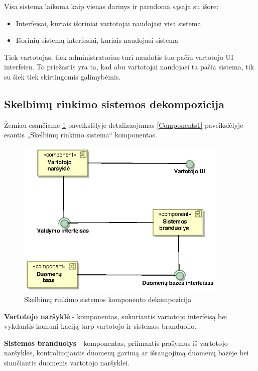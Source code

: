 \documentclass[12pt]{article}
\begin{document}
	 Visa sistema laikoma kaip vienas darinys ir parodoma sąsaja su išore:
	
	\begin{itemize}	
		\item Interfeisai, kuriais išoriniai vartotojai naudojasi visa sistema
		\item Išorinių sistemų interfesiai, kuriais naudojasi sistema
	\end{itemize}
	
	Tiek vartotojas, tiek administratorius turi naudotis tuo pačiu vartotojo UI interfeisu. To priežastis yra ta, kad abu vartotojai naudojasi ta pačia sistema, tik su šiek tiek skirtingomis galimybėmis.	
	\pagebreak

	\subsection{Skelbimų rinkimo sistemos dekompozicija}
	Žemiau esančiame \ref{Components2} paveikslėlyje detalizuojamas \ref{Components1} paveikslėlyje esantis „Skelbimų rinkimo sistema“ komponentas.
	\begin{figure}[h]
		\begin{center}
			\includegraphics[width=0.9\textwidth]{Komponentai2.eps}
			\caption{Skelbimų rinkimo sistemos komponento dekompozicija\label{Components2}}
		\end{center}
	\end{figure}

	\textbf{Vartotojo naršyklė} - komponentas, sukuriantis vartotojo interfeisą bei vykdantis komuni-kaciją tarp vartotojo ir sistemos branduolio.

	
	\textbf{Sistemos branduolys} - komponentas, priimantis prašymus iš vartotojo naršyklės, kontroliuojantis duomenų gavimą ar išsaugojimą duomenų bazėje bei siunčiantis duomenis vartotojo naršyklei.
\end{document}
